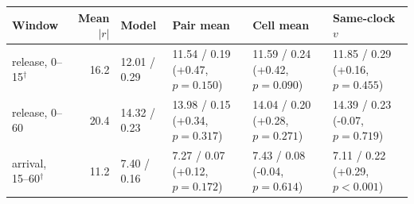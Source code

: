 \begin{tabular}{lrllll}
\toprule
Window & Mean $|r|$ & Model & Pair mean & Cell mean & Same-clock $v$ \\
\midrule
release, 0--15$^\dagger$ & 16.2 & 12.01 / 0.29 & 11.54 / 0.19 (+0.47, $p=0.150$) & 11.59 / 0.24 (+0.42, $p=0.090$) & 11.85 / 0.29 (+0.16, $p=0.455$) \\
release, 0--60 & 20.4 & 14.32 / 0.23 & 13.98 / 0.15 (+0.34, $p=0.317$) & 14.04 / 0.20 (+0.28, $p=0.271$) & 14.39 / 0.23 (-0.07, $p=0.719$) \\
arrival, 15--60$^\dagger$ & 11.2 & 7.40 / 0.16 & 7.27 / 0.07 (+0.12, $p=0.172$) & 7.43 / 0.08 (-0.04, $p=0.614$) & 7.11 / 0.22 (+0.29, $p<0.001$) \\
\bottomrule
\end{tabular}
